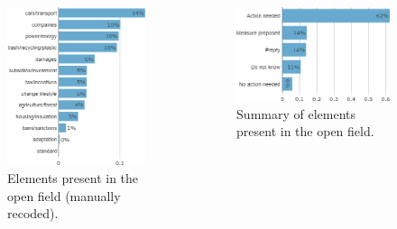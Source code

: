 \begin{framefont}{\small}
\begin{frame} %
 \begin{columns}
 \begin{column}{0.5\textwidth}
 \begin{figure}
   \caption{Elements present in the open field (manually recoded).}
   \includegraphics[width=.43\paperwidth]{../figures/FR/CC_field_mentions_raw_FR.png}
 \end{figure}
 \end{column}
 \begin{column}{0.5\textwidth}
 \begin{figure}
   \caption{Summary of elements present in the open field.}
   \includegraphics[width=.43\paperwidth]{../figures/FR/CC_field_mentions_FR.png}
 \end{figure}
 \end{column}
 \end{columns}
 \end{frame}


\end{framefont}
